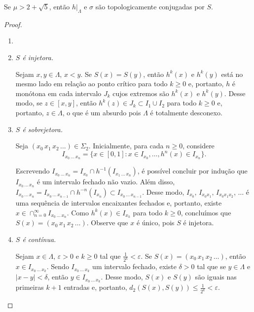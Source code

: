 \begin{theorem}\label{teo 6-1}
Se $\mu > 2 + \sqrt{5}$, então $h|_\Lambda$ e $\sigma$ são topologicamente conjugadas por $S$.
\end{theorem}

\begin{proof}
\begin{enumerate}[label=\alph*)]\item[]
\item \textit{$S$ é injetora.}

Sejam $x, y \in \Lambda$, $x < y$. Se $S(x) = S(y)$, então $h^k(x)$ e $h^k(y)$ está no mesmo lado em relação ao ponto crítico para todo $k \geq 0$ e, portanto, $h$ é monótona em cada intervalo $J_k$ cujos extremos são $h^k(x)$ e $h^k(y)$. Desse modo, se $z \in [x, y]$, então $h^k(z) \in J_k \subset I_1 \cup I_2$ para todo $k \geq 0$ e, portanto, $z \in \Lambda$, o que é um absurdo pois $\Lambda$ é totalmente desconexo.

\item \textit{$S$ é sobrejetora.}

Seja $(x_0 \, x_1 \, x_2 \, \dots) \in \Sigma_2$. Inicialmente, para cada $n \geq 0$, considere
$$I_{x_0 \, \dots \, x_n} = \lbrace x \in [0,1] : x \in I_{x_0}, \dots, h^n(x) \in I_{x_n} \rbrace.$$

Escrevendo $I_{x_0 \, \dots \, x_n} = I_{x_0} \cap h^{-1}(I_{x_1 \, \dots \, x_n})$, é possível concluir por indução que $I_{x_0 \, \dots \, x_n}$ é um intervalo fechado não vazio.
Além disso, $I_{x_0 \, \dots \, x_n} = I_{x_0 \, \dots \, x_{n-1}} \cap h^{-n}(I_{x_n}) \subset I_{x_0 \, \dots \, x_{n-1}}$.
Desse modo, $I_{x_0}, \, I_{x_0 x_1}, \, I_{x_0 x_1 x_2}, \, \dots$ é uma sequência de intervalos encaixantes fechados e, portanto, existe $x \in \cap_{n=0}^\infty I_{x_0 \, \dots \, x_n}$. Como $h^k(x) \in I_{x_k}$ para todo $k \geq 0$, concluímos que $S(x) = (x_0 \, x_1 \, x_2 \, \dots)$. Observe que $x$ é único, pois $S$ é injetora.

\item \textit{$S$ é contínua.}

Sejam $x \in \Lambda$, $\varepsilon > 0$ e $k \geq 0$ tal que $\frac{1}{2^k} < \varepsilon$. Se $S(x) = (x_0 \, x_1 \, x_2 \, \dots)$, então $x \in I_{x_0 \, \dots \, x_k}$. Sendo $I_{x_0 \, \dots \, x_k}$ um intervalo fechado, existe $\delta > 0$ tal que se $y \in \Lambda$ e $|x-y| < \delta$, então $y \in I_{x_0 \, \dots \, x_k}$. Desse modo, $S(x)$ e $S(y)$ são iguais nas primeiras $k+1$ entradas e, portanto, $d_2(S(x), S(y)) \leq \frac{1}{2^k} < \varepsilon$.


\end{enumerate}
\end{proof}
